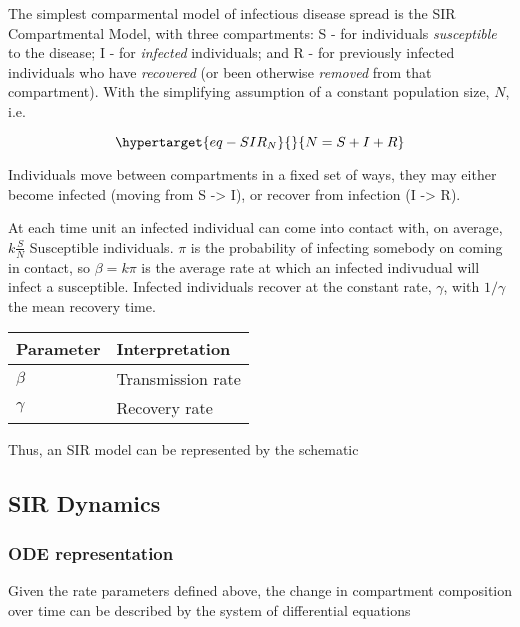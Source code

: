 \documentclass{monashthesis}
\begin{document}
The simplest comparmental model of infectious disease spread is the SIR
Compartmental Model, with three compartments: S - for individuals
\emph{susceptible} to the disease; I - for \emph{infected} individuals;
and R - for previously infected individuals who have \emph{recovered}
(or been otherwise \emph{removed} from that compartment). With the
simplifying assumption of a constant population size, \(N\), i.e.

\begin{equation}\protect\hypertarget{eq-SIR_N}{}{
N = S + I + R
}\label{eq-SIR_N}\end{equation}

Individuals move between compartments in a fixed set of ways, they may
either become infected (moving from S -\textgreater{} I), or recover
from infection (I -\textgreater{} R).

At each time unit an infected individual can come into contact with, on
average, \(k\frac{S}{N}\) Susceptible individuals. \(\pi\) is the
probability of infecting somebody on coming in contact, so
\(\beta = k\pi\) is the average rate at which an infected indivudual
will infect a susceptible. Infected individuals recover at the constant
rate, \(\gamma\), with \(1/\gamma\) the mean recovery time.

\begin{longtable}[]{@{}ll@{}}
\toprule\noalign{}
Parameter & Interpretation \\
\midrule\noalign{}
\endhead
\bottomrule\noalign{}
\endlastfoot
\(\beta\) & Transmission rate \\
\(\gamma\) & Recovery rate \\
\end{longtable}

Thus, an SIR model can be represented by the schematic

\hypertarget{sir-dynamics}{%
\subsection{SIR Dynamics}\label{sir-dynamics}}

\hypertarget{ode-representation}{%
\subsubsection{ODE representation}\label{ode-representation}}

Given the rate parameters defined above, the change in compartment
composition over time can be described by the system of differential
equations
\end{document}
